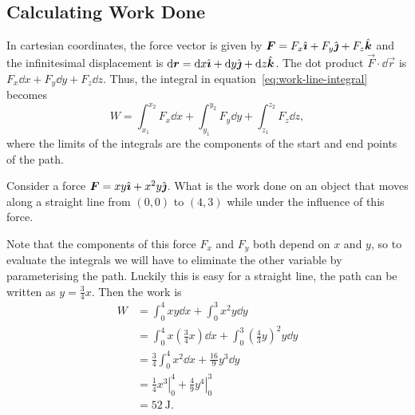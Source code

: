 \documentclass[../classical_mechanics.tex]{subfiles}
\begin{document}
        \subsection{Calculating Work Done}\label{subsec:calculating-work-done}
            In cartesian coordinates, the force vector is given by $\boldsymbol{F}=F_x\hat{\boldsymbol{\imath}}+F_y\hat{\boldsymbol{\jmath}}+F_z\hat{\boldsymbol{k}}$ and the infinitesimal displacement is $\dd{\vec{r}}=\dd{x}\ihat+\dd{y}\jhat+\dd{z}\khat$.
            The dot product $\vec{F}\cdot\dd{\vec{r}}$ is $F_x\dd{x}+F_y\dd{y}+F_z\dd{z}$.
            Thus, the integral in equation~\ref{eq:work-line-integral} becomes
            \begin{equation}
                W=\int_{x_1}^{x_2}F_x\dd{x}+\int_{y_1}^{y_2}F_y\dd{y}+\int_{z_1}^{z_2}F_z\dd{z},
            \end{equation}
            where the limits of the integrals are the components of the start and end points of the path.
            \begin{example}\label{ex:work-cartesian}
                Consider a force $\boldsymbol{F}=xy\hat{\boldsymbol{\imath}}+x^2y\hat{\boldsymbol{\jmath}}$.
                What is the work done on an object that moves along a straight line from $(0,0)$ to $(4,3)$ while under the influence of this force.

                Note that the components of this force $F_x$ and $F_y$ both depend on $x$ and $y$, so to evaluate the integrals we will have to eliminate the other variable by parameterising the path.
                Luckily this is easy for a straight line, the path can be written as $y=\frac{3}{4}x$.
                Then the work is
                \begin{align}
                    W&=\int_0^4 xy\dd{x}+\int_0^3x^2y\dd{y}\\
                    &=\int_0^4 x\left(\frac{3}{4}x\right)\dd{x}+\int_0^3\left(\frac{4}{3}y\right)^2y\dd{y}\\
                    &=\frac{3}{4}\int_0^4x^2\dd{x}+\frac{16}{9}y^3\dd{y}\\
                    &=\left.\frac{1}{4}x^3\right|_0^4+\left.\frac{4}{9}y^4\right|_0^3\\
                    &=\qty{52}{\joule}.
                \end{align}
            \end{example}
            
\end{document}
